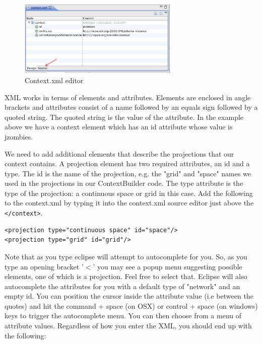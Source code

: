 \documentclass[11pt]{amsart}
\begin{document}
\begin{figure}[h]
\begin{center}
\vspace{.2in}
\centerline {
\includegraphics[width=3in]{GettingStartedImages/cedit.png}
}
\caption{Context.xml editor}
\label{fig:cedit}
\end{center}
\end{figure}

XML works in terms of elements and attributes. Elements are enclosed in angle brackets and attributes consist of a name followed by an equals sign followed by a quoted string. The quoted string is the value of the attribute. In the example above we have a context element which has an id attribute whose value is jzombies. 

We need to add additional elements that describe the projections that our context contains.  A projection element has two required attributes, an id and a type. The id is the name of the projection, e.g. the "grid" and "space" names we used in the projections in our ContextBuilder code. The type attribute is the type of the projection: a continuous space or grid in this case. Add the following to the context.xml by typing it into the context.xml source editor just above the \texttt{</context>}.

\noindent\begin{minipage}[h]{\textwidth}
\vspace{.2in}
\lstset{language=java,caption=JZombiesBuilder.build Complete }
\begin{lstlisting}
<projection type="continuous space" id="space"/>
<projection type="grid" id="grid"/>

\end{lstlisting}
\vspace{.2in}
\end{minipage}
Note that as you type eclipse will attempt to autocomplete for you. So, as you type an opening bracket '$<$' you may see a popup menu suggesting  possible elements, one of which is a projection. Feel free to select that. Eclipse will also autocomplete the attributes for you with a default type of "network" and an empty id. You can position the cursor inside the attribute value (i.e between the quotes) and hit the command + space (on OSX) or control + space (on windows) keys to trigger the autocomplete menu. You can then choose from a menu of attribute values. Regardless of how you enter the XML, you should end up with the following:
\end{document}
